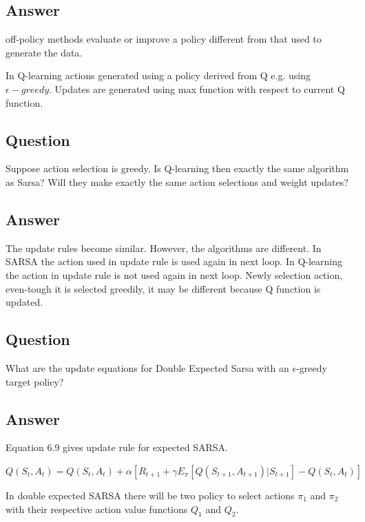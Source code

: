 \documentclass[11pt]{article}
\begin{document}
    \subsection*{Answer}

    off-policy methods evaluate or improve a policy different from that used to generate the data.

    In Q-learning actions generated using a policy derived from Q e.g. using $\epsilon-greedy$.
    Updates are generated using max function with respect to current Q function.

    \subsection{Question}

    Suppose action selection is greedy.
    Is Q-learning then exactly the same algorithm as Sarsa?
    Will they make exactly the same action selections and weight updates?

    \subsection*{Answer}

    The update rules become similar.
    However, the algorithms are different.
    In SARSA the action used in update rule is used again in next loop.
    In Q-learning the action in update rule is not used again in next loop.
    Newly selection action, even-tough it is selected greedily, it may be different because Q function is updated.

    \subsection{Question}

    What are the update equations for Double Expected Sarsa with an $\epsilon$-greedy target policy?

    \subsection*{Answer}

    Equation 6.9 gives update rule for expected SARSA.
    \newline

    $ Q(S_t, A_t) =  Q(S_t, A_t) + \alpha [ R_{t+1} + \gamma E_{\pi} [ Q(S_{t+1}, A_{t+1}) | S_{t+1}] - Q(S_t, A_t) ] $
    \newline

    In double expected SARSA there will be two policy to select actions $\pi_1$ and $\pi_2$  with their respective action value functions $Q_1$ and $Q_2$.
    \newline
\end{document}
